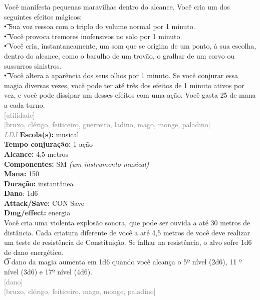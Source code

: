 \documentclass{RPG_Adventure}[2021/10/20]
\begin{document}
{\normalsize Você manifesta pequenas maravilhas dentro do alcance. Você cria um dos seguintes efeitos mágicos:\\\t • Sua voz ressoa com o triplo do volume normal por 1 minuto.\\\t • Você provoca tremores inofensivos no solo por 1 minuto.\\\t • Você cria, instantaneamente, um som que se origina de um ponto, à sua escolha, dentro do alcance, como o barulho de um trovão, o gralhar de um corvo ou sussurros sinistros.\\\t • Você altera a aparência dos seus olhos por 1 minuto.  Se você conjurar essa magia diversas vezes, você pode ter até três dos efeitos de 1 minuto ativos por vez, e você pode dissipar um desses efeitos com uma ação. Você gasta 25 de mana a cada turno.\\}
{\scriptsize \textcolor{gray}{[utilidade]\\}}
{\scriptsize \textcolor{gray}{[bruxo, clérigo, feiticeiro, guerreiro, ladino, mago, monge, paladino]\\}}
{\tiny \textcolor{gray}{\textit{LDJ}}}
{\small \t \textbf{Escola(s):} musical\\\t \textbf{Tempo conjuração:} 1 ação\\\t \textbf{Alcance:} 4,5 metros\\\t \textbf{Componentes:} SM \textit{(um instrumento musical)}\\\t \textbf{Mana:} 150\\\t \textbf{Duração:} instantânea\\\t \textbf{Dano}: 1d6\\\t \textbf{Attack/Save:} CON Save\\\t \textbf{Dmg/effect:} energia\\}
{\normalsize Você cria uma violenta explosão sonora, que pode ser ouvida a até 30 metros de distância. Cada criatura diferente de você a até 4,5 metros de você deve realizar um teste de resistência de Constituição. Se falhar na resistência, o alvo sofre 1d6 de dano energético.\\\t O dano da magia aumenta em 1d6 quando você alcança o 5º nível (2d6), 11 º nível (3d6) e 17º nível (4d6).\\}
{\scriptsize \textcolor{gray}{[dano]\\}}
{\scriptsize \textcolor{gray}{[bruxo, clérigo, feiticeiro, mago, monge, paladino]\\}}
\end{document}
